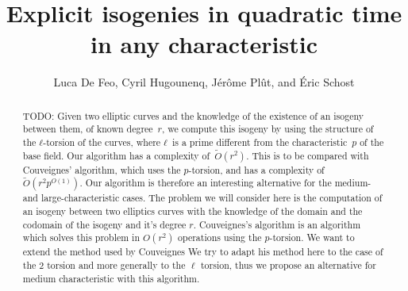 \documentclass{lms}
\title[Explicit isogenies in any characteristic]{Explicit isogenies in quadratic time in any characteristic}
\author[L. De Feo, C. Hugounenq, J. Plût, É. Schost]%
  {Luca De Feo, Cyril Hugounenq, Jérôme Plût, and Éric Schost}
\newcommand{\todo}[1]{{\color{red}TODO: #1}}
\newcommand{\tildO}{\tilde{O}}
\begin{document}
\maketitle

\begin{abstract}
\todo{
Given two elliptic curves and the knowledge of the existence of
an isogeny between them, of known degree~$r$,
we compute this isogeny by using
the structure of the $ℓ$-torsion of the curves,
where $ℓ$~is a prime different from the characteristic~$p$ of the base field.
Our algorithm has a complexity of~$\tildO(r^2)$.
This is to be compared with Couveignes' algorithm,
which uses the $p$-torsion, and has a complexity of~$\tildO(r^2 p^{O(1)})$.
Our algorithm is therefore an interesting alternative
for the medium- and large-characteristic cases.
}
The problem we will consider here is the computation of an isogeny between two elliptics curves with the knowledge of the domain and the codomain of the isogeny and it's degree $r$. Couveignes's algorithm is an algorithm which solves this problem in $O(r^2)$ operations using the $p$-torsion. We want to extend the method used by Couveignes  We try to adapt his method here to the case of the $2$ torsion and more generally to the $\ell$ torsion, thus we propose an alternative for medium characteristic with this algorithm.
\end{abstract}



\end{document}
